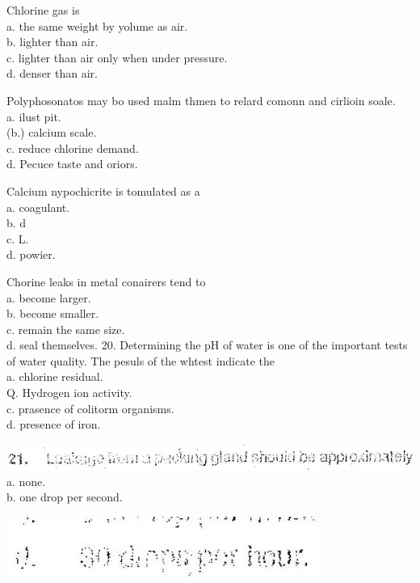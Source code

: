 \documentclass[10pt]{article}
\begin{document}
Chlorine gas is\\
a. the same weight by yolume as air.\\
b. lighter than air.\\
c. lighter than air only when under pressure.\\
d. denser than air.

Polyphosonatos may bo used malm thmen to relard comonn and cirlioin soale.\\
a. ilust pit.\\
(b.) calcium scale.\\
c. reduce chlorine demand.\\
d. Pecuce taste and oriors.

Calcium nypochicrite is tomulated as a\\
a. coagulant.\\
b. d\\
c. L.\\
d. powier.

Chorine leaks in metal conairers tend to\\
a. become larger.\\
b. become smaller.\\
c. remain the same size.\\
d. seal themselves. 20. Determining the pH of water is one of the important tests of water quality. The pesuls of the whtest indicate the\\
a. chlorine residual.\\
Q. Hydrogen ion activity.\\
c. prasence of colitorm organisms.\\
d. presence of iron.

\includegraphics[max width=\textwidth]{2022_11_11_ca6a6c1a0324ee23e523g-20}\\
a. none.\\
b. one drop per second.

\includegraphics[max width=\textwidth]{2022_11_11_ca6a6c1a0324ee23e523g-20(1)}
\end{document}

